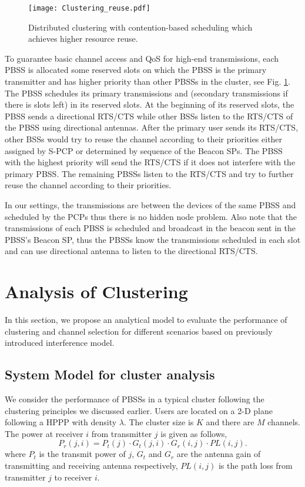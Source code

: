 \documentclass[10pt, conference, letterpaper]{IEEEtran}
\begin{document}
\begin{figure}
	\centering
	\texttt{[image: Clustering\_reuse.pdf]}
	\caption{Distributed clustering  with contention-based scheduling which achieves higher resource reuse.}
	\label{fig:clustering:reuse}
\end{figure}

To guarantee basic channel access and QoS for high-end transmissions, each PBSS is allocated some reserved slots on which the PBSS is the primary transmitter and has higher priority than other PBSSs in the cluster, see Fig. \ref{fig:clustering:reuse}. 
The PBSS schedules its primary transmissions and (secondary transmissions if there is slots left) in its reserved slots. 
At the beginning of its reserved slots, the PBSS sends a directional RTS/CTS while other BSSs listen to the RTS/CTS of the PBSS using directional antennas. 
After the primary user sends its RTS/CTS, other BSSs would try to reuse the channel according to their priorities either assigned by S-PCP or determined by sequence of the Beacon SPs. 
The PBSS with the highest priority will send the RTS/CTS if it does not interfere with the primary PBSS. 
The remaining PBSSs listen to the RTS/CTS and try to further reuse the channel according to their priorities. 

In our settings, the transmissions are between the devices of the same PBSS and scheduled by the PCPs thus there is no hidden node problem. 
Also note that the transmissions of each PBSS is scheduled and broadcast in the beacon sent in the PBSS's Beacon SP, thus the PBSSs know the transmissions scheduled in each slot and can use directional antenna to listen to the directional RTS/CTS. 

\section{Analysis of Clustering}\label{section:clusteranalysis}
In this section, we propose an analytical model to evaluate the performance of clustering and channel selection for different scenarios based on previously introduced interference model.

\subsection{System Model for cluster analysis}
We consider the performance of PBSSs in a typical cluster following the clustering principles we discussed earlier. 
Users are located on a 2-D plane following a HPPP with density $\lambda$.
The cluster size is $K$ and there are $M$ channels. 
The power at receiver $i$ from transmitter $j$ is given as follows, 
\begin{equation*}
P_r(j,i) = P_t(j)\cdot G_t(j,i) \cdot G_r(i,j) \cdot PL(i,j).
\end{equation*} 
where $P_t$ is the transmit power of $j$, $G_t$ and $G_r$ are the antenna gain of transmitting and receiving antenna respectively, $PL(i,j)$ is the path loss from transmitter $j$ to receiver $i$.
\end{document}
